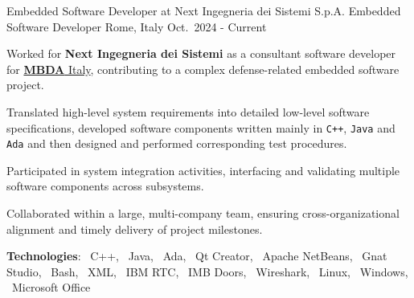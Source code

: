 

\begin{cventries}


    \cventry
    {Embedded Software Developer at Next Ingegneria dei Sistemi S.p.A.}
    {Embedded Software Developer}
    {Rome, Italy}
    {Oct.\ 2024 - Current}
    {
        \begin{cvitems} %
            \item Worked for \textbf{Next Ingegneria dei Sistemi} as a consultant software developer for \href{https://www.mbda-systems.com/country-it?rc=1}{\textbf{MBDA} Italy}, contributing to a complex defense-related embedded software project.
            \item Translated high-level system requirements into detailed low-level software specifications, developed software components written mainly in \texttt{C++}, \texttt{Java} and \texttt{Ada} and then designed and performed corresponding test procedures.
            \item Participated in system integration activities, interfacing and validating multiple software components across subsystems.
            \item Collaborated within a large, multi-company team, ensuring cross-organizational alignment and timely delivery of project milestones.
            \item[] \textbf{\textcolor{awesome-red}{Tec}hnologies}: \cpplogo{}~C++, \javalogo{}~Java, \adalogo{}~Ada, \qtlogo{}~Qt Creator, \netbeanslogo{}~Apache NetBeans, \gnatlogo{}~Gnat Studio, \bashlogo{}~Bash, \xmllogo{}~XML, \rtclogo{}~IBM RTC, \doorslogo{}~IMB Doors, \wiresharklogo{}~Wireshark, \linuxlogo{}~Linux, \windowslogo{}~Windows, \officelogo{}~Microsoft Office
        \end{cvitems}
    }

    

\end{cventries}
